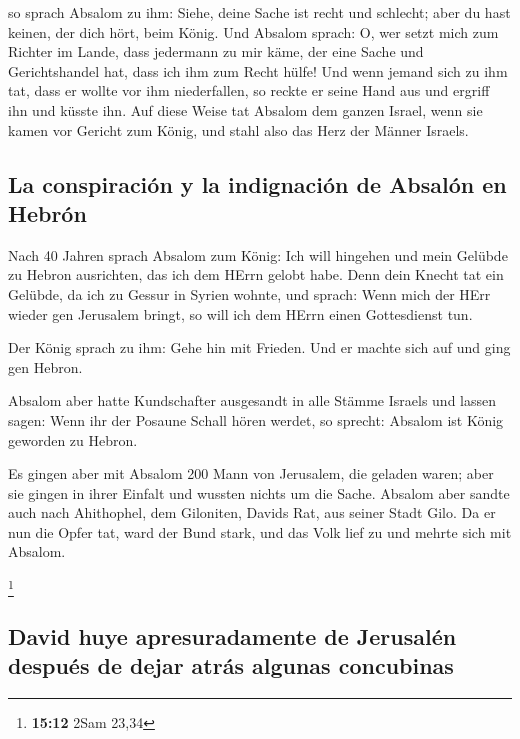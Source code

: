  so sprach Absalom zu ihm: Siehe, deine Sache ist recht
und schlecht; aber du hast keinen, der dich hört, beim König.
 Und Absalom sprach: O, wer setzt mich zum Richter im
Lande, dass jedermann zu mir käme, der eine Sache und Gerichtshandel
hat, dass ich ihm zum Recht hülfe!  Und wenn jemand sich
zu ihm tat, dass er wollte vor ihm niederfallen, so reckte er seine Hand
aus und ergriff ihn und küsste ihn.  Auf diese Weise tat
Absalom dem ganzen Israel, wenn sie kamen vor Gericht zum König, und
stahl also das Herz der Männer Israels.

\hypertarget{la-conspiraciuxf3n-y-la-indignaciuxf3n-de-absaluxf3n-en-hebruxf3n}{%
\subsection{La conspiración y la indignación de Absalón en
Hebrón}\label{la-conspiraciuxf3n-y-la-indignaciuxf3n-de-absaluxf3n-en-hebruxf3n}}

 Nach 40 Jahren sprach Absalom zum König: Ich will
hingehen und mein Gelübde zu Hebron ausrichten, das ich dem HErrn gelobt
habe.  Denn dein Knecht tat ein Gelübde, da ich zu Gessur
in Syrien wohnte, und sprach: Wenn mich der HErr wieder gen Jerusalem
bringt, so will ich dem HErrn einen Gottesdienst tun.

 Der König sprach zu ihm: Gehe hin mit Frieden. Und er
machte sich auf und ging gen Hebron.

 Absalom aber hatte Kundschafter ausgesandt in alle
Stämme Israels und lassen sagen: Wenn ihr der Posaune Schall hören
werdet, so sprecht: Absalom ist König geworden zu Hebron.

 Es gingen aber mit Absalom 200 Mann von Jerusalem, die
geladen waren; aber sie gingen in ihrer Einfalt und wussten nichts um
die Sache.  Absalom aber sandte auch nach Ahithophel, dem
Giloniten, Davids Rat, aus seiner Stadt Gilo. Da er nun die Opfer tat,
ward der Bund stark, und das Volk lief zu und mehrte sich mit Absalom.

\footnote{\textbf{15:12} 2Sam 23,34}

\hypertarget{david-huye-apresuradamente-de-jerusaluxe9n-despuuxe9s-de-dejar-atruxe1s-algunas-concubinas}{%
\subsection{David huye apresuradamente de Jerusalén después de dejar
atrás algunas
concubinas}\label{david-huye-apresuradamente-de-jerusaluxe9n-despuuxe9s-de-dejar-atruxe1s-algunas-concubinas}}

